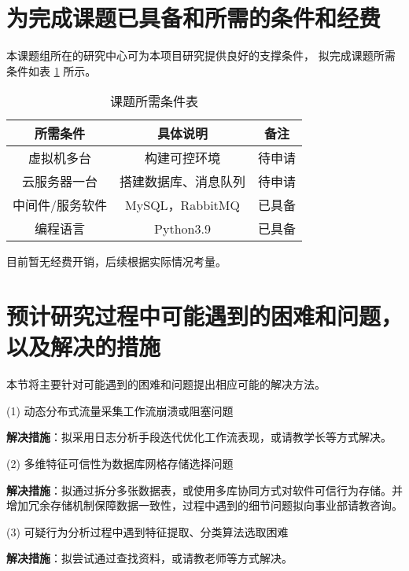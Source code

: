 
\section{为完成课题已具备和所需的条件和经费}
本课题组所在的研究中心可为本项目研究提供良好的支撑条件，
拟完成课题所需条件如表 \ref{table:课题所需条件表} 所示。

\begin{table}[htbp]
	\centering
	\caption{课题所需条件表}\label{table:课题所需条件表}
	\vspace{0.5em}\wuhao
	\begin{tabular}{ccc}
		\toprule
		所需条件        & 具体说明     & 备注    \\
		\midrule
		虚拟机多台          & 构建可控环境           & 待申请      \\
		云服务器一台          & 搭建数据库、消息队列  & 待申请  \\
		中间件/服务软件         & MySQL，RabbitMQ   & 已具备 \\
		编程语言         & Python3.9  & 已具备 \\
	


		\bottomrule
	\end{tabular}
\end{table}

目前暂无经费开销，后续根据实际情况考量。

\section{预计研究过程中可能遇到的困难和问题，以及解决的措施}
本节将主要针对可能遇到的困难和问题提出相应可能的解决方法。

(1) 动态分布式流量采集工作流崩溃或阻塞问题

\textbf{解决措施}：拟采用日志分析手段迭代优化工作流表现，或请教学长等方式解决。 

(2) 多维特征可信性为数据库网格存储选择问题

\textbf{解决措施}：拟通过拆分多张数据表，或使用多库协同方式对软件可信行为存储。并增加冗余存储机制保障数据一致性，过程中遇到的细节问题拟向事业部请教咨询。

(3) 可疑行为分析过程中遇到特征提取、分类算法选取困难

\textbf{解决措施}：拟尝试通过查找资料，或请教老师等方式解决。


